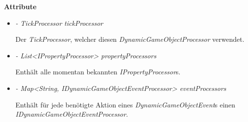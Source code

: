             \textbf{Attribute}
            \begin{itemize}
                \item  \textit{- TickProcessor tickProcessor}
                    \begin{leftbar}[0.9\linewidth]
                        Der \textit{TickProcessor}, welcher diesen \textit{DynamicGameObjectProcessor} verwendet.
                    \end{leftbar}
                \item \textit{- List<IPropertyProcessor> propertyProcessors}
                    \begin{leftbar}[0.9\linewidth]
                        Enthält alle momentan bekannten \textit{IPropertyProcessor}s.
                    \end{leftbar}
                \item \textit{- Map<String, IDynamicGameObjectEventProcessor> eventProcessors}
                    \begin{leftbar}[0.9\linewidth]
                        Enthält für jede benötigte Aktion eines \textit{DynamicGameObjectEvent}s einen \textit{IDynamicGameObjectEventProcessor}.
                    \end{leftbar}
            \end{itemize}

